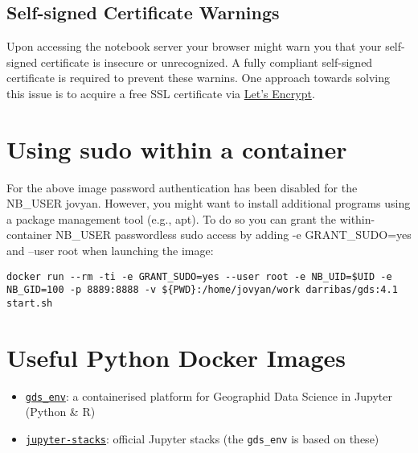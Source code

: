 \documentclass[
]{book}
\providecommand{\tightlist}{%
  \setlength{\itemsep}{0pt}\setlength{\parskip}{0pt}}
\begin{document}
\hypertarget{self-signed-certificate-warnings}{%
\subsection{Self-signed Certificate Warnings}\label{self-signed-certificate-warnings}}

Upon accessing the notebook server your browser might warn you that your self-signed certificate is
insecure or unrecognized. A fully compliant self-signed certificate is required to prevent these warnins.
One approach towards solving this issue is to acquire a free SSL certificate via
\href{https://jupyter-notebook.readthedocs.io/en/stable/public_server.html\#using-let-s-encrypt}{Let's Encrypt}.

\hypertarget{using-sudo-within-a-container}{%
\section{Using sudo within a container}\label{using-sudo-within-a-container}}

For the above image password authentication has been disabled for the NB\_USER jovyan. However, you might want to install additional programs using a package management tool (e.g., apt). To do so you can grant the within-container NB\_USER passwordless sudo access by adding -e GRANT\_SUDO=yes and --user root when launching the image:

\begin{verbatim}
docker run --rm -ti -e GRANT_SUDO=yes --user root -e NB_UID=$UID -e NB_GID=100 -p 8889:8888 -v ${PWD}:/home/jovyan/work darribas/gds:4.1 start.sh  
\end{verbatim}

\hypertarget{useful-python-docker-images}{%
\section{Useful Python Docker Images}\label{useful-python-docker-images}}

\begin{itemize}
\tightlist
\item
  \href{https://github.com/darribas/gds_env}{\texttt{gds\_env}}: a containerised platform
  for Geographid Data Science in Jupyter (Python \& R)
\item
  \href{https://github.com/jupyter/docker-stacks}{\texttt{jupyter-stacks}}: official
  Jupyter stacks (the \texttt{gds\_env} is based on these)
\end{itemize}
\end{document}
